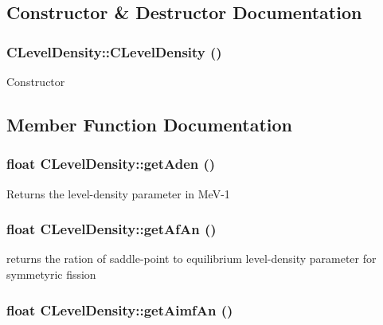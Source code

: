 \subsection{Constructor \& Destructor Documentation}
\subsubsection{\setlength{\rightskip}{0pt plus 5cm}CLevel\-Density::CLevel\-Density ()\hspace{0.3cm}{\tt  [private]}}\label{classCLevelDensity_e6428caecb1135b705ac39adf873b135}


Constructor 

\subsection{Member Function Documentation}
\subsubsection{\setlength{\rightskip}{0pt plus 5cm}float CLevel\-Density::get\-Aden ()}\label{classCLevelDensity_29ce0edb568e2c2e261438e99dbebb81}


Returns the level-density parameter in Me\-V-1 
\subsubsection{\setlength{\rightskip}{0pt plus 5cm}float CLevel\-Density::get\-Af\-An ()\hspace{0.3cm}{\tt  [static]}}\label{classCLevelDensity_812ad4c5a5c2c41006a513a68a274d4b}


returns the ration of saddle-point to equilibrium level-density parameter for symmetyric fission 
\subsubsection{\setlength{\rightskip}{0pt plus 5cm}float CLevel\-Density::get\-Aimf\-An ()\hspace{0.3cm}{\tt  [static]}}\label{classCLevelDensity_b5ae5183066b912f311399fee5f430ac}



